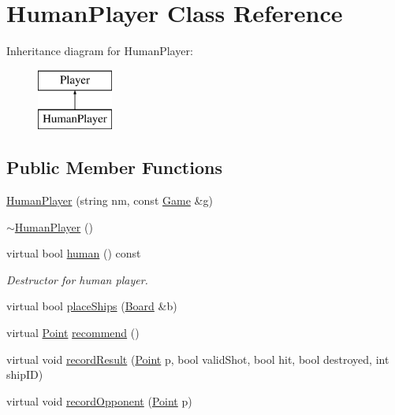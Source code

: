 \hypertarget{class_human_player}{}\section{Human\+Player Class Reference}
\label{class_human_player}
Inheritance diagram for Human\+Player\+:\begin{figure}[H]
\begin{center}
\leavevmode
\includegraphics[height=2.000000cm]{class_human_player}
\end{center}
\end{figure}
\subsection*{Public Member Functions}
\begin{DoxyCompactItemize}
\item 
\mbox{\hyperlink{class_human_player_a70910b8414dda741db2e2f08e048cfe4}{Human\+Player}} (string nm, const \mbox{\hyperlink{class_game}{Game}} \&g)
\item 
\mbox{\hyperlink{class_human_player_abdeb9d120fc74c8d82ec0c688883f16f}{$\sim$\+Human\+Player}} ()
\item 
virtual bool \mbox{\hyperlink{class_human_player_acecbe621447504a013c2a763aaba05fa}{human}} () const
\begin{DoxyCompactList}\small\item\em Destructor for human player. \end{DoxyCompactList}\item 
virtual bool \mbox{\hyperlink{class_human_player_ae9315a3c66f6b2f2bf4d1ebb09669aff}{place\+Ships}} (\mbox{\hyperlink{class_board}{Board}} \&b)
\item 
virtual \mbox{\hyperlink{class_point}{Point}} \mbox{\hyperlink{class_human_player_a718f16f3ddeeb34c9f2e93cf1d805b46}{recommend}} ()
\item 
virtual void \mbox{\hyperlink{class_human_player_a19be81244b7a1c88a3ca89d207055b6e}{record\+Result}} (\mbox{\hyperlink{class_point}{Point}} p, bool valid\+Shot, bool hit, bool destroyed, int ship\+ID)
\item 
virtual void \mbox{\hyperlink{class_human_player_a16b18f42e02d7c8d1f0971ce5e91595f}{record\+Opponent}} (\mbox{\hyperlink{class_point}{Point}} p)
\end{DoxyCompactItemize}


